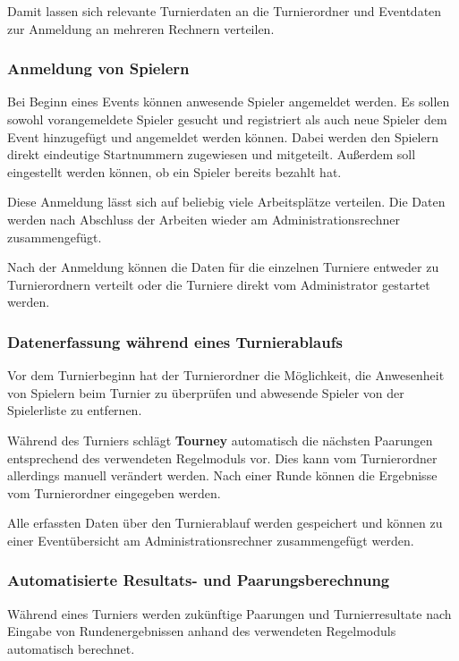 \documentclass[11pt]{article}
\begin{document}
Damit lassen sich relevante Turnierdaten an die Turnierordner und Eventdaten zur Anmeldung an mehreren Rechnern verteilen.

\newpage

\subsubsection{Anmeldung von Spielern}

Bei Beginn eines Events können anwesende Spieler angemeldet werden. Es sollen sowohl vorangemeldete Spieler gesucht und registriert als auch neue Spieler dem Event hinzugefügt und angemeldet werden können. Dabei werden den Spielern direkt eindeutige Startnummern zugewiesen und mitgeteilt. Außerdem soll eingestellt werden können, ob ein Spieler bereits bezahlt hat.

Diese Anmeldung lässt sich auf beliebig viele Arbeitsplätze verteilen. Die Daten werden nach Abschluss der Arbeiten wieder am Administrationsrechner zusammengefügt.

Nach der Anmeldung können die Daten für die einzelnen Turniere entweder zu Turnierordnern verteilt oder die Turniere direkt vom Administrator gestartet werden.

\subsubsection{Datenerfassung während eines Turnierablaufs}

Vor dem Turnierbeginn hat der Turnierordner die Möglichkeit, die Anwesenheit von Spielern beim Turnier zu überprüfen und abwesende Spieler von der Spielerliste zu entfernen.

Während des Turniers schlägt \textbf{Tourney} automatisch die nächsten Paarungen entsprechend des verwendeten Regelmoduls vor. Dies kann vom Turnierordner allerdings manuell verändert werden. Nach einer Runde können die Ergebnisse vom Turnierordner eingegeben werden.

Alle erfassten Daten über den Turnierablauf werden gespeichert und können zu einer Eventübersicht am Administrationsrechner zusammengefügt werden.

\subsubsection{Automatisierte Resultats- und Paarungsberechnung}

Während eines Turniers werden zukünftige Paarungen und Turnierresultate nach Eingabe von Rundenergebnissen anhand des verwendeten Regelmoduls automatisch berechnet.
\end{document}
